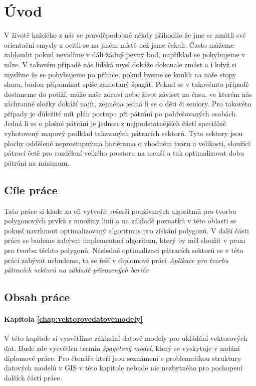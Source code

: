 \chapter{Úvod}
	V životě každého z nás se pravděpodobně někdy přihodilo že jme se zmátli své orientační smysly a ocitli se na jiném místě než jsme čekali. Často můžeme zabloudit pokud nevidíme v dáli žádný pevný bod, například se pohybujeme v mlze. V takovém případě nás lidská mysl dokáže dokonale zmást a i když si myslíme že se pohybujeme po přímce, pokud bysme se koukli na naše stopy shora, budou připomínat spíše zamotaný špagát. Pokud se v takovémto případě dostaneme do potíží, může naše zdraví nebo život záviset na času, ve kterém nás záchranné složky dokáží najít, zejména jedná li se o děti či seniory.
	Pro takovéto případy je důležité mít plán postupu při pátrání po pohřešovaných osobách. Jedná li se o plošné pátrání je jednou z nejpodstatnějších částí speciálně vyhotovený mapový podklad takzvaných pátracích sektorů. Tyto sektory jsou plochy oddělené neprostupnýma bariérama o vhodném tvaru a velikosti, sloužící pátrací četě pro rozdělení velkého prostoru na menší a tak optimalizovat dobu pátrání na minimum.
		
\section{Cíle práce}
	Tato práce si klade za cíl vytvořit rešerši používaných algoritmů pro tvorbu polygonových prvků z množiny linií a na základě poznatků v této oblasti se pokusí navrhnout optimalizovaný algoritmus pro získání polygonů. V další části práce se budeme zabývat implementací algoritmu, který by měl sloužit v praxi pro tvorbu těchto polygonů. Následné optimalizaci pátracích sektorů se v této práci zabývat nebudeme, ta se řeší v diplomové práci \textit{Aplikace pro tvorbu pátracích sektorů na základě přirozených bariér} \cite{sladkova2019aplikace}
	
\section{Obsah práce}

\subsubsection{Kapitola \ref{chap:vektorovedatovemodely}}
	V této kapitole si vysvětlíme základní datové modely pro ukládání vektorových dat. Bude zde vysvětlen termín \textit{špagetový model}, který se vyskytuje v zadání diplomové práce. Pro čtenáře kteří jsou seznámeni s problematikou struktury datových modelů v GIS v této kapitole nebude nic nezbytného pro pochopení dalších částí práce.


